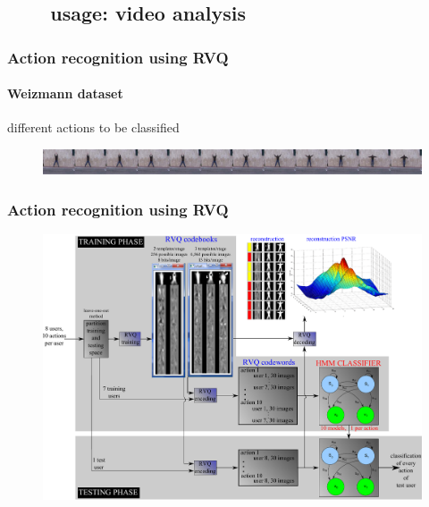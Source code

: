 \begin{frame}[plain]
\begin{columns}
\begin{column}{2.8in}
\begin{figure}
			\end{figure}
			\hspace{-0.2in}
	\end{column}
	\end{columns}
\end{frame}

\subsection{\ \ \ \ usage: video analysis}
\begin{frame}
\frametitle{Action recognition using RVQ}
\framesubtitle{Weizmann dataset}
 different actions to be classified
	\begin{figure}	
		\includegraphics[width=1.0\textwidth]{figs/RVQ_HMM_IPCV2010_Weizmann_dataset.pdf}
	\end{figure}
	\hspace{0.6in}
\end{frame}


\begin{frame}[plain]
\frametitle{Action recognition using RVQ}
	\begin{changemargin}{-1.3in}{0in}
	\begin{figure}	
		\includegraphics[width=1.35\textwidth]{figs/RVQ_HMM_IPCV2010_blockDiagram.pdf}
	\end{figure}
	\end{changemargin}
\end{frame}


